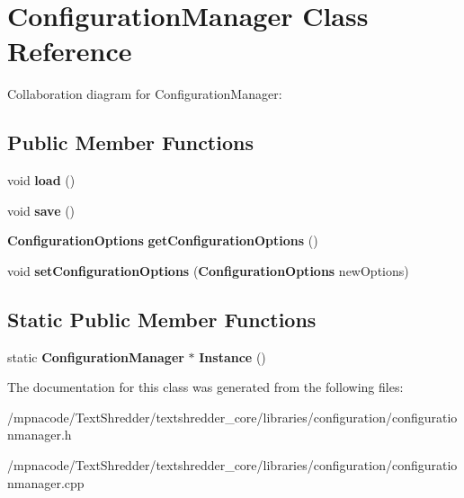 \section{ConfigurationManager Class Reference}
\label{class_configuration_manager}


Collaboration diagram for ConfigurationManager:
\subsection*{Public Member Functions}
\begin{DoxyCompactItemize}
\item 
void {\bfseries load} ()\label{class_configuration_manager_ad4bcaee14bd62192b31af1735cf0da77}

\item 
void {\bfseries save} ()\label{class_configuration_manager_a2ad213166283926fffb06da68ff781e9}

\item 
{\bf ConfigurationOptions} {\bfseries getConfigurationOptions} ()\label{class_configuration_manager_afc52eab5f967588ed6cf98dbb8559783}

\item 
void {\bfseries setConfigurationOptions} ({\bf ConfigurationOptions} newOptions)\label{class_configuration_manager_a194ca87842be1613ce98c02cbcffe680}

\end{DoxyCompactItemize}
\subsection*{Static Public Member Functions}
\begin{DoxyCompactItemize}
\item 
static {\bf ConfigurationManager} $\ast$ {\bfseries Instance} ()\label{class_configuration_manager_a578eaaaa5bf2494c2c87c92acb1026b0}

\end{DoxyCompactItemize}


The documentation for this class was generated from the following files:\begin{DoxyCompactItemize}
\item 
/mpnacode/TextShredder/textshredder\_\-core/libraries/configuration/configurationmanager.h\item 
/mpnacode/TextShredder/textshredder\_\-core/libraries/configuration/configurationmanager.cpp\end{DoxyCompactItemize}

